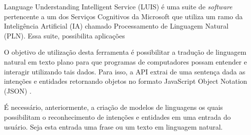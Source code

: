 Language Understanding Intelligent Service (LUIS) é uma suite de \textit{software} pertencente a um dos Serviços Cognitivos da Microsoft que utiliza um ramo da Inteligência Artificial (IA) chamado Processamento de Linguagem Natural (PLN)\cite{Mayo:2017}. Essa suite, possibilita aplicações 

O objetivo de utilização desta ferramenta é possibilitar a tradução de linguagem natural em texto plano para que programas de computadores possam entender e interagir utilizando tais dados. Para isso, a API extrai de uma sentença dada as intenções e entidades retornando objetos no formato JavaScript Object Notation (JSON) \cite{Mayo:2017}.

É necessário, anteriormente, a criação de modelos de linguagens os quais possibilitam o reconhecimento de intenções e entidades em uma entrada do usuário. Seja esta entrada uma frase ou um texto em linguagem natural.
